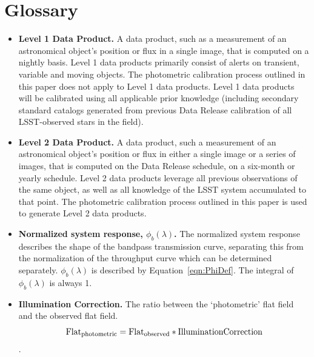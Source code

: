 \documentclass[12pt,preprint]{aastex}
\begin{document}



\section{Glossary}
\label{sec:glossary}

\begin{itemize}

\item{{\bf Level 1 Data Product.} A data product, such as a measurement
  of an astronomical object's position or flux in a single image, that
is computed on a nightly basis. Level 1 data products primarily
consist of alerts on transient, variable and moving objects. The
photometric calibration process outlined in this paper does not apply
to Level 1 data products. Level 1 data products will be calibrated
using all applicable prior knowledge (including secondary standard
catalogs generated from previous Data Release calibration of all
LSST-observed stars in the field). }

\item{{\bf Level 2 Data Product.} A data product, such a measurement
    of an astronomical object's position or flux in either a single
    image or a series of images, that is computed on the Data Release
    schedule, on a six-month or yearly schedule. Level 2 data products
    leverage all previous observations of the same object, as well as
    all knowledge of the LSST system accumulated to that point. The
    photometric calibration process outlined in this paper is used to
    generate Level 2 data products. }

\item{{\bf Normalized system response, $\phi_b(\lambda)$.} The
    normalized system response describes the shape of the bandpass
    transmission curve, separating this from the normalization of the
    throughput curve which can be determined separately.
    $\phi_b(\lambda)$ is described by Equation~\ref{eqn:PhiDef}. The
    integral of $\phi_b(\lambda)$ is always 1. }

\item{{\bf Illumination Correction.} The ratio between the
    `photometric' flat field  and the observed flat field. 
\begin{equation}
\rm{Flat}_{photometric} = \rm{Flat}_{observed} * \rm{Illumination
 Correction}
\end{equation}. 
}


\end{itemize}
\end{document}
